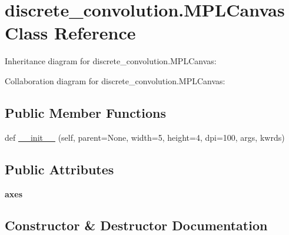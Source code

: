 \hypertarget{classdiscrete__convolution_1_1MPLCanvas}{}\section{discrete\+\_\+convolution.\+M\+P\+L\+Canvas Class Reference}
\label{classdiscrete__convolution_1_1MPLCanvas}


Inheritance diagram for discrete\+\_\+convolution.\+M\+P\+L\+Canvas\+:


Collaboration diagram for discrete\+\_\+convolution.\+M\+P\+L\+Canvas\+:
\subsection*{Public Member Functions}
\begin{DoxyCompactItemize}
\item 
def \hyperlink{classdiscrete__convolution_1_1MPLCanvas_a7862be3948d59052187c86d081bf0cc9}{\+\_\+\+\_\+init\+\_\+\+\_\+} (self, parent=None, width=5, height=4, dpi=100, args, kwrds)
\end{DoxyCompactItemize}
\subsection*{Public Attributes}
\begin{DoxyCompactItemize}
\item 
\mbox{\label{classdiscrete__convolution_1_1MPLCanvas_a07e0e76aed7c61b111022adc3e40e57c}} 
{\bfseries axes}
\end{DoxyCompactItemize}


\subsection{Constructor \& Destructor Documentation}
\mbox{\label{classdiscrete__convolution_1_1MPLCanvas_a7862be3948d59052187c86d081bf0cc9}} 
